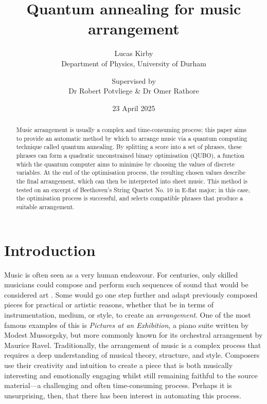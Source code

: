 \documentclass[12pt]{article}
\title{Quantum annealing for music arrangement}
\author{Lucas Kirby\\Department of Physics, University of Durham \and Supervised by\\Dr Robert Potvliege \& Dr Omer Rathore}
\date{23 April 2025}
\begin{document}
\maketitle

\vfill

\begin{abstract}              

Music arrangement is usually a complex and time-consuming process; this paper aims to provide an automatic method by which to arrange music via a quantum computing technique called quantum annealing. By splitting a score into a set of phrases, these phrases can form a quadratic unconstrained binary optimisation (QUBO), a function which the quantum computer aims to minimise by choosing the values of discrete variables. At the end of the optimisation process, the resulting chosen values describe the final arrangement, which can then be interpreted into sheet music. This method is tested on an excerpt of Beethoven's String Quartet No. 10 in E-flat major; in this case, the optimisation process is successful, and selects compatible phrases that produce a suitable arrangement. \cite{lucas_ising_2014}

\end{abstract}

\vfill

\begin{center}
    
\end{center}

\thispagestyle{empty}
\clearpage

\tableofcontents

\thispagestyle{empty}
\clearpage

\section{Introduction}

\begin{figure}
    \tiny
    
\end{figure}

Music is often seen as a very human endeavour. For centuries, only skilled musicians could compose and perform such sequences of sound that would be considered art \cite{dwave_manufactured_2011}. Some would go one step further and adapt previously composed pieces for practical or artistic reasons, whether that be in terms of instrumentation, medium, or style, to create an \textit{arrangement}. One of the most famous examples of this is \textit{Pictures at an Exhibition}, a piano suite written by Modest Mussorgsky, but more commonly known for its orchestral arrangement by Maurice Ravel.
Traditionally, the arrangement of music is a complex process that requires a deep understanding of musical theory, structure, and style. Composers use their creativity and intuition to create a piece that is both musically interesting and emotionally engaging whilst still remaining faithful to the source material—a challenging and often time-consuming process. Perhaps it is unsurprising, then, that there has been interest in automating this process.
\end{document}
